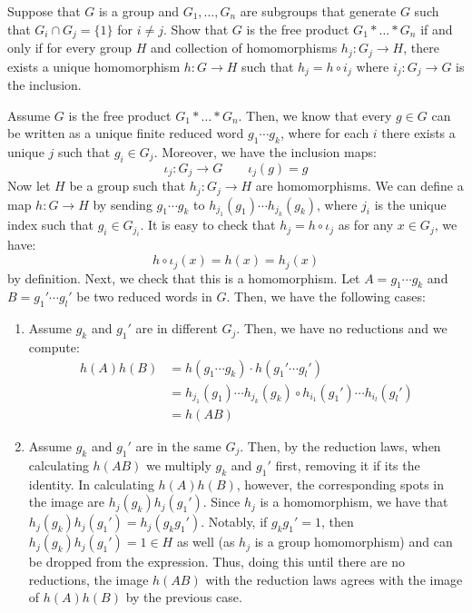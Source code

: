 \documentclass[12pt]{article}
\begin{document}
\begin{problem}{3}
    Suppose that $G$ is a group and $G_1, \hdots, G_n$ are subgroups that generate $G$ such that $G_i \cap G_j = \{ 1 \}$ for $i \neq j$. Show that $G$ is the free product $G_1 * \hdots * G_n$ if and only if for every group $H$ and collection of homomorphisms $h_j : G_j \to H$, there exists a unique homomorphism $h: G \to H$ such that $h_j = h \circ i_j$ where $i_j: G_j \to G$ is the inclusion.
\end{problem}
\begin{solution}
    Assume $G$ is the free product $G_1 * \hdots * G_n$. Then, we know that every $g \in G$ can be written as a unique finite reduced word $g_1 \cdots g_k$, where for each $i$ there exists a unique $j$ such that $g_i \in G_j$. Moreover, we have the inclusion maps: 
    \[ \iota_j : G_j \to G \qquad \iota_j(g) = g\] 
    Now let $H$ be a group such that $h_j : G_j \to H$ are homomorphisms. We can define a map $h: G \to H$ by sending $g_1 \cdots g_k$ to $h_{j_1}(g_1) \cdots h_{j_k}(g_k)$, where $j_i$ is the unique index such that $g_i \in G_{j_i}$. It is easy to check that $h_j = h \circ \iota_j$ as for any $x \in G_j$, 
    we have: 
    \[ h \circ \iota_j(x) = h(x) = h_j(x)\]
    by definition. Next, we check that this is a homomorphism. Let $A = g_1 \cdots g_k$ and $B = g_1' \cdots g_l'$ be two reduced words in $G$. Then, we have the following cases:
    \begin{enumerate}
        \item Assume $g_k$ and $g_1'$ are in different $G_j$. Then, we have no reductions and we compute: 
        \begin{align*}
            h(A)h(B) &= h(g_1 \cdots g_k) \cdot h(g_1' \cdots g_l') \\
            &= h_{j_1}(g_1) \cdots h_{j_k}(g_k) \circ h_{i_1}(g_1') \cdots h_{i_l}(g_l') \\
            &= h(AB)
        \end{align*}
        \item Assume $g_k$ and $g_1'$ are in the same $G_j$. Then, by the reduction laws, when calculating $h(AB)$ we multiply $g_k$ and $g_1'$ first, removing it if its the identity. In calculating $h(A)h(B)$, however, the corresponding spots in the image are $h_j(g_k)h_j(g_1')$. Since $h_j$ is a homomorphism, we have that $h_j(g_k)h_j(g_1') = h_j(g_k g_1')$. Notably, if $g_k g_1' = 1$, then $h_j(g_k)h_j(g_1') = 1 \in H$ as well (as $h_j$ is a group homomorphism) and can be dropped from the expression. Thus, doing this until there are no reductions, the image $h(AB)$ with the reduction laws agrees with the image of $h(A)h(B)$ by the previous case.

\end{enumerate}
\end{solution}
\end{document}

